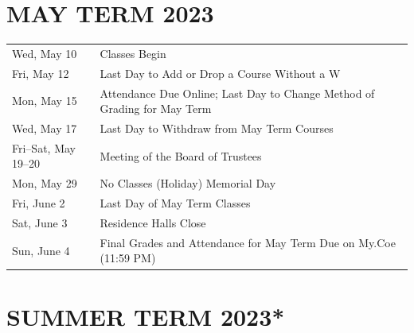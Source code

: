 \documentclass[
  letterpaper,
]{scrbook}
\renewcommand\toprule[2]\relax
\renewcommand\bottomrule[2]\relax
\begin{document}
\section{MAY TERM 2023}\label{may-term-2023}

\begin{longtable}[]{@{}
  >{\raggedright\arraybackslash}p{}
  >{\raggedleft\arraybackslash}p{}@{}}
\toprule\noalign{}
\endhead
\bottomrule\noalign{}
\endlastfoot
Wed, May 10 & Classes Begin \\
Fri, May 12 & Last Day to Add or Drop a Course Without a W \\
Mon, May 15 & Attendance Due Online; Last Day to Change Method of
Grading for May Term \\
Wed, May 17 & Last Day to Withdraw from May Term Courses \\
Fri--Sat, May 19--20 & Meeting of the Board of Trustees \\
Mon, May 29 & No Classes (Holiday) Memorial Day \\
Fri, June 2 & Last Day of May Term Classes \\
Sat, June 3 & Residence Halls Close \\
Sun, June 4 & Final Grades and Attendance for May Term Due on My.Coe
(11:59 PM) \\
\end{longtable}

\section{SUMMER TERM 2023*}\label{summer-term-2023}
\end{document}
